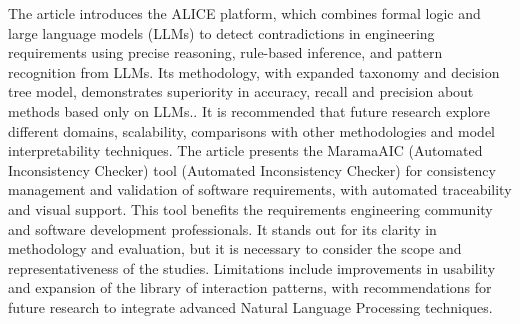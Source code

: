 The article \cite{Gartner2024} introduces the ALICE platform, which combines formal logic and large language models (LLMs) to detect contradictions in engineering requirements using precise reasoning, rule-based inference, and pattern recognition from LLMs. Its methodology, with expanded taxonomy and decision tree model, demonstrates superiority in accuracy, recall and precision about methods based only on LLMs.\newline.
It is recommended that future research explore different domains, scalability, comparisons with other methodologies and model interpretability techniques.
\newline
The article \cite{kamalrudin2017maramaaic} presents the MaramaAIC (Automated Inconsistency Checker) tool (Automated Inconsistency Checker) for consistency management and validation of software requirements, with automated traceability and visual support. This tool benefits the requirements engineering community and software development professionals. It stands out for its clarity in methodology and evaluation, but it is necessary to consider the scope and representativeness of the studies. Limitations include improvements in usability and expansion of the library of interaction patterns, with recommendations for future research to integrate advanced Natural Language Processing techniques.
